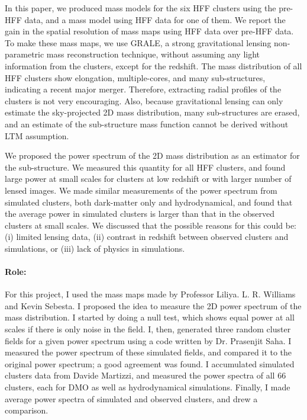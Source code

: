 \documentclass[
  11pt,
  twoside,
  openright,
  titlepage,
  headings=optiontoheadandtoc
]{scrbook}
\begin{document}
In this paper, we produced mass models for the six HFF clusters using the pre-HFF
data, and a mass model using HFF data for one of them. We report the gain in the
spatial resolution of mass maps using HFF data over pre-HFF data. To make
these mass maps, we use GRALE, a strong gravitational lensing non-parametric 
mass reconstruction technique, without assuming any light information from
the clusters, except for the redshift. The mass distribution of all HFF
clusters show elongation, multiple-cores, and many sub-structures, 
indicating a recent major merger. Therefore, extracting radial profiles
of the clusters is not very encouraging. Also, because gravitational lensing
can only estimate the sky-projected 2D mass distribution, many sub-structures
are erased, and an estimate of the sub-structure mass function
cannot be derived without LTM assumption. 

We proposed the power spectrum of the 2D mass distribution as an estimator
for the sub-structure. We measured this quantity for all HFF clusters, and 
found large power at small scales for clusters at low redshift or with
larger number of lensed images. We made similar measurements of the
power spectrum from simulated clusters, both dark-matter only and 
hydrodynamical, and
found that the average power in simulated clusters is larger than that
in the observed clusters at small scales. We discussed that the possible reasons
for this could be: (i) limited lensing data, (ii) contrast in redshift between
observed clusters and simulations, or (iii) lack of physics in simulations.


\paragraph{Role:} For this project, I used the mass maps made by Professor
Liliya. L. R. Williams and Kevin Sebesta. 
I proposed the idea to measure the 2D power spectrum
of the mass distribution. I started
by doing a null test, which shows equal power at all scales if there is
only noise in the field. I, then, generated three random cluster fields 
for a given power spectrum using a code written by Dr. Prasenjit Saha. I 
measured the power spectrum of these simulated fields, and compared it to 
the original power spectrum; a good agreement was found. I accumulated 
simulated clusters data from Davide Martizzi, and measured the power spectra
of all 66 clusters, each for DMO as well as hydrodynamical simulations. Finally, 
I made average power spectra of simulated and observed clusters, and
drew a comparison.
\end{document}
